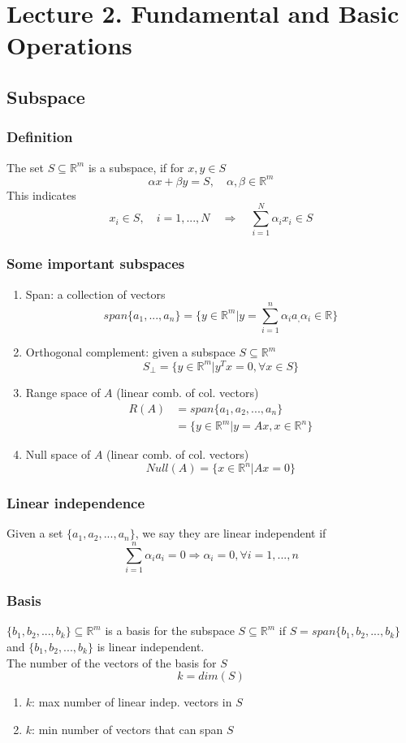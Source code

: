 \section{Lecture 2. Fundamental and Basic Operations}
\begin{multicols}{2}
\subsection{Subspace}
\subsubsection{Definition}
The set $S\subseteq\mathbb{R}^m$ is a subspace, if for $x,y\in S$
\[
    \alpha x + \beta y = S,\quad \alpha, \beta \in \mathbb{R}^m
\]
This indicates
\[
    x_i\in S,\quad i=1,...,N\quad \Longrightarrow\quad \sum_{i=1}^N\alpha_i x_i \in S
\]
\subsubsection{Some important subspaces}
\begin{enumerate}
    \item Span: a collection of vectors 
    \[
        span\{a_1,...,a_n\}=\{y\in\mathbb{R}^m | y= \sum_{i=1}^n\alpha_ia_,\alpha_i\in\mathbb{R}\}
    \]
    \item Orthogonal complement: given a subspace $S\subseteq \mathbb{R}^m$
    \[
        S_\bot = \{y\in\mathbb{R}^m|y^Tx=0,\forall x\in S\}
    \]
    \item Range space of $A$ (linear comb. of col. vectors)
    \[
        \begin{array}{rl}
            R(A) &= span\{a_1,a_2,...,a_n\} \\
            & =\{y\in\mathbb{R}^m|y=Ax,x\in\mathbb{R}^n\}
        \end{array}       
    \]
    \item Null space of $A$ (linear comb. of col. vectors)
    \[
        Null(A)=\{x\in\mathbb{R}^n|Ax=0\}
    \]
\end{enumerate}
\subsubsection{Linear independence}
Given a set $\{a_1,a_2,...,a_n\}$, we say they are linear independent if
\[
    \sum_{i=1}^n\alpha_ia_i=0\Longrightarrow \alpha_i=0,\forall i=1,...,n
\]
\subsubsection{Basis}
$\{b_1,b_2,...,b_k\}\subseteq \mathbb{R}^m$ is a basis for the subspace $S\subseteq \mathbb{R}^m$ 
if $S=span\{b_1,b_2,...,b_k\}$ and $\{b_1,b_2,...,b_k\}$ is linear independent. \\
The number of the vectors of the basis for $S$
\[
    k=dim(S)
\]
\begin{enumerate}
    \item $k$: max number of linear indep. vectors in $S$
    \item $k$: min number of vectors that can span $S$
\end{enumerate}

\end{multicols}

